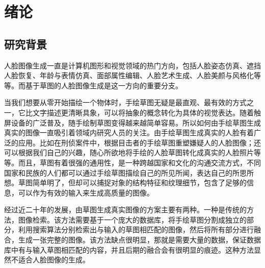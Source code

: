 
\chapter{绪论}

\section{研究背景}

%
%
%

人脸图像生成一直是计算机图形和视觉领域的热门方向，包括人脸姿态仿真\cite{Yin_2017_ICCV}、遮挡人脸恢复\cite{Li_2017_CVPR}、年龄与表情仿真\cite{G_2017_ICIP,ggfr}、面部属性编辑\cite{attrgan}、人脸艺术生成\cite{carigan}、人脸美颜与风格化\cite{beautygan}等等。而基于草图的人脸图像生成是这一方向的重要分支。

当我们想要从零开始描绘一个物体时，手绘草图无疑是最直观、最有效的方式之一，它比文字描述更清晰具象，可以将抽象的概念转化为具体的视觉表达。随着触屏设备的广泛普及，随手绘制草图变得越来越简单容易。所以如何由手绘草图生成真实的图像一直吸引着领域内研究人员的关注。由手绘草图生成真实的人脸有着广泛的应用。比如在刑侦案件中，根据目击者的手绘草图重塑嫌疑人的人脸图像；还可以根据我们自己的兴趣，随心所欲地将手绘的人脸草图转化成真实的人脸照片等等。而且，草图有着很强的通用性，是一种跨越国家和文化的沟通交流方式，不同国家和民族的人们都可以通过手绘草图描绘自己的所见所闻，表达自己的所思所想。草图简单明了，但却可以捕捉对象的结构特征和纹理细节，包含了足够的信息，可以作为有效的输入来生成高质量的图像。

经过近二十年的发展，由草图生成真实图像的方案主要有两种。一种是传统的方法，图像检索。该方法需要基于一个庞大的数据库，将手绘草图分割成独立的部分，利用搜索算法分别检索出与输入的草图相匹配的图像，然后将所有部分进行融合，生成一张完整的图像。该方法缺点很明显，那就是需要大量的数据，保证数据库中有与输入草图相匹配的内容，并且后期的融合会有很明显的痕迹。这种方法显然不适合人脸图像的生成。

